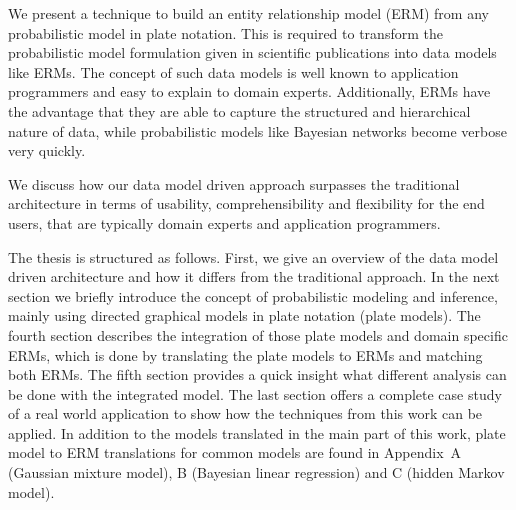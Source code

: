 We present a technique to build an entity relationship model (ERM) from any probabilistic model in plate notation. This is required to transform the probabilistic model formulation given in scientific publications into data models like ERMs. The concept of such data models is well known to application programmers and easy to explain to domain experts. Additionally, ERMs have the advantage that they are able to capture the structured and hierarchical nature of data, while probabilistic models like Bayesian networks become verbose very quickly.

We discuss how our data model driven approach surpasses the traditional architecture in terms of usability, comprehensibility and flexibility for the end users, that are typically domain experts and application programmers.

The thesis is structured as follows. First, we give an overview of the data model driven architecture and how it differs from the traditional approach. In the next section we briefly introduce the concept of probabilistic modeling and inference, mainly using directed graphical models in plate notation (plate models). The fourth section describes the integration of those plate models and domain specific ERMs, which is done by translating the plate models to ERMs and matching both ERMs. The fifth section provides a quick insight what different analysis can be done with the integrated model. The last section offers a complete case study of a real world application to show how the techniques from this work can be applied. In addition to the models translated in the main part of this work, plate model to ERM translations for common models are found in Appendix~A (Gaussian mixture model), B (Bayesian linear regression) and C (hidden Markov model).
